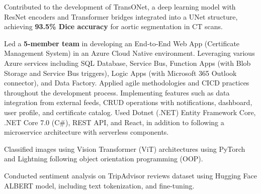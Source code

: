 \begin{cventries}
{\begin{cvitemsfree}
                \item{Contributed to the development of TransONet, a deep learning model with ResNet encoders and Transformer bridges integrated into a UNet structure, achieving \textbf{93.5\% Dice accuracy} for aortic segmentation in CT scans.}
                \item{Led a \textbf{5-member team} in developing an End‑to‑End Web App (Certificate Management System) in an Azure Cloud Native environment. Leveraging various Azure services including SQL Database, Service Bus, Function Apps (with Blob Storage and Service Bus triggers), Logic Apps (with Microsoft 365 Outlook connector), and Data Factory. Applied agile methodologies and CI\/CD practices throughout the development process. Implementing features such as data integration from external feeds, CRUD operations with notifications, dashboard, user profile, and certificate catalog. Used Dotnet (.NET) Entity Framework Core, .NET Core 7.0 (C\#), REST API, and React, in addition to following a microservice architecture with serverless components.}
                \item{Classified images using Vision Transformer (ViT) architectures using PyTorch and Lightning following object orientation programming (OOP).}
                \item{Conducted sentiment analysis on TripAdvisor reviews dataset using Hugging Face ALBERT model, including text tokenization, and fine-tuning.}
            \end{cvitemsfree}
        }
\end{cventries}